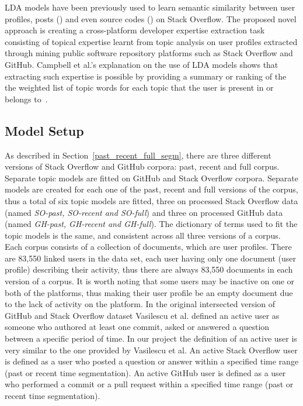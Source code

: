     LDA models have been previously used to learn semantic similarity between user profiles, posts (\cite{tian2013predicting}) and even source codes (\cite{arwan2015source}) on Stack Overflow. The proposed novel approach is creating a cross-platform developer expertise extraction task consisting of topical expertise learnt from topic analysis on user profiles extracted through mining public software repository platforms such as Stack Overflow and GitHub. Campbell et al.'s explanation on the use of LDA models shows that extracting such expertise is possible by providing a summary or ranking of the the weighted list of topic words for each topic that the user is present in or belongs to~\cite{campbell2015latent}. 
        
    \subsection{Model Setup} \label{activeUser_Def}
    
        As described in Section~\ref{past_recent_full_segm}, there are three different versions of Stack Overflow and GitHub corpora: past, recent and full corpus. Separate topic models are fitted on GitHub and Stack Overflow corpora. Separate models are created for each one of the past, recent and full versions of the corpus, thus a total of six topic models are fitted, three on processed Stack Overflow data (named \emph{SO-past, SO-recent and SO-full}) and three on processed GitHub data (named \emph{GH-past, GH-recent and GH-full}). The dictionary of terms used to fit the topic models is the same, and consistent across all three versions of a corpus. Each corpus consists of a collection of documents, which are user profiles. There are 83,550 linked users in the data set, each user having only one document (user profile) describing their activity, thus there are always 83,550 documents in each version of a corpus. It is worth noting that some users may be inactive on one or both of the platforms, thus making their user profile be an empty document due to the lack of activity on the platform. In the original intersected version of GitHub and Stack Overflow dataset Vasilescu et al. \cite{vasilescu2013stackoverflow} defined an active user as someone who authored at least one commit, asked or answered a question between a specific period of time. In our project the definition of an active user is very similar to the one provided by Vasilescu et al. An active Stack Overflow user is defined as a user who posted a question or answer within a specified time range (past or recent time segmentation). An active GitHub user is defined as a user who performed a commit or a pull request within a specified time range (past or recent time segmentation).
    
